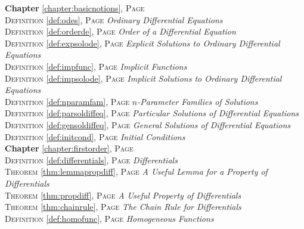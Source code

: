 
\begin{multicols}{2}
      \setlength{\parindent}{0pt}
      \footnotesize{

\textbf{Chapter} \ref{chapter:basicnotions}, \textsc{Page} \pageref{chapter:basicnotions} \\
\textsc{Definition} \ref{def:odes}, \textsc{Page} \pageref{def:odes} \textit{Ordinary Differential Equations} \\
\textsc{Definition} \ref{def:orderde}, \textsc{Page} \pageref{def:orderde} \textit{Order of a Differential Equation} \\
\textsc{Definition} \ref{def:expsolode}, \textsc{Page} \pageref{def:expsolode} \textit{Explicit Solutions to Ordinary Differential Equations} \\
\textsc{Definition} \ref{def:impfunc}, \textsc{Page} \pageref{def:impfunc} \textit{Implicit Functions} \\
\textsc{Definition} \ref{def:impsolode}, \textsc{Page} \pageref{def:impsolode} \textit{Implicit Solutions to Ordinary Differential Equations} \\
\textsc{Definition} \ref{def:nparamfam}, \textsc{Page} \pageref{def:nparamfam} \textit{\(n\)-Parameter Families of Solutions} \\
\textsc{Definition} \ref{def:parsoldiffeq}, \textsc{Page} \pageref{def:parsoldiffeq} \textit{Particular Solutions of Differential Equations} \\
\textsc{Definition} \ref{def:gensoldiffeq}, \textsc{Page} \pageref{def:gensoldiffeq} \textit{General Solutions of Differential Equations} \\
\textsc{Definition} \ref{def:initcond}, \textsc{Page} \pageref{def:initcond} \textit{Initial Conditions} \\
\textbf{Chapter} \ref{chapter:firstorder}, \textsc{Page} \pageref{chapter:firstorder} \\
\textsc{Definition} \ref{def:differentials}, \textsc{Page} \pageref{def:differentials} \textit{Differentials} \\
\textsc{Theorem} \ref{thm:lemmapropdiff}, \textsc{Page} \pageref{thm:lemmapropdiff} \textit{A Useful Lemma for a Property of Differentials} \\
\textsc{Theorem} \ref{thm:propdiff}, \textsc{Page} \pageref{thm:propdiff} \textit{A Useful Property of Differentials} \\
\textsc{Theorem} \ref{thm:chainrule}, \textsc{Page} \pageref{thm:chainrule} \textit{The Chain Rule for Differentials} \\
\textsc{Definition} \ref{def:homofunc}, \textsc{Page} \pageref{def:homofunc} \textit{Homogeneous Functions} \\
}
\end{multicols}
